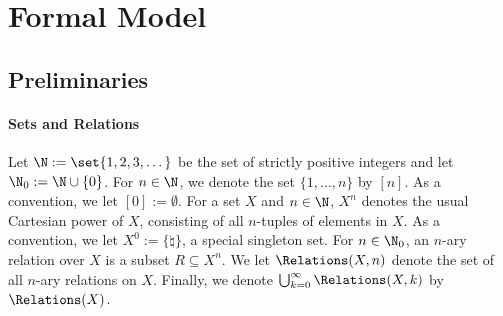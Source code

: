 
\section{Formal Model}\label{sec:formalModel-trees}

\subsection{Preliminaries}\label{subsec:preliminaries}
\paragraph*{Sets and Relations}\label{par:setAndRelations}

Let $\N := \set{1, 2, 3, \dots}$ be the set of strictly positive integers and let $\N_0 := \N \cup \{0\}$. For $n \in \N$, we denote the set $\{1, \ldots, n\}$ by $[n]$. As a convention, we let $[0] := \emptyset$. For a set $X$ and $n \in \N$, $X^n$ denotes the usual Cartesian power of $X$, consisting of all $n$-tuples of elements in $X$. As a convention, we let $X^0 := \{\natural\}$, a special singleton set.
For $n \in \N_0$, an $n$-ary relation over $X$ is a subset $R
\subseteq X^n$. We let $\Relations(X, n)$ denote the set of all
$n$-ary relations on $X$. Finally, we denote $\bigcup_{k=0}^\infty
\Relations(X, k)$ by $\Relations(X)$.

